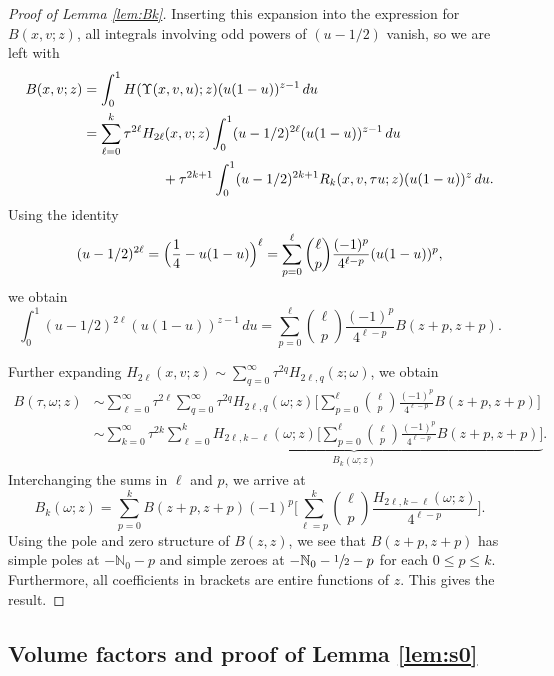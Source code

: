 \documentclass[JEP,XML,SOM,Unicode,NoFloatCountersInSection, NoEqCountersInSection,published]{cedram}
\theoremstyle{plain}
\theoremstyle{definition}
\theoremstyle{remark}
\def\Nm{{\mathbb{N}}}
\begin{document}
\begin{proof}[Proof of Lemma \ref{lem:Bk}]
Inserting this expansion into the expression for $B(x,v; z)$, all integrals involving odd powers of $(u-1/2)$ vanish, so we
are left with
\begin{align*}
B(x,v; z) &= \int_0^1 H(\Upsilon(x,v,u); z) (u(1-u))^{z-1}\,du \\
&= \sum_{\ell=0}^{k} \tau^{2\ell} H_{2\ell}(x,v; z) \int_0^1 (u-1/2)^{2\ell} (u(1-u))^{z-1}\,du \\
&\hspace*{2cm} + \tau^{2k+1} \int_0^1 (u-1/2)^{2k+1} R_{k} (x,v,\tau u; z) (u(1-u))^z\,du.
\end{align*}
Using the identity
\begin{equation*}
(u-1/2)^{2\ell} = \Bigl(\frac{1}{4} - u(1-u) \Bigr)^\ell = \sum_{p=0}^\ell \binom{\ell}{p} \frac{(-1)^p}{4^{\ell-p}} (u(1-u))^p,
\end{equation*}
we obtain
\begin{equation*}
\int_0^1 (u-1/2)^{2\ell} (u(1-u))^{z-1}\,du = \sum_{p=0}^\ell \binom{\ell}{p} \frac{(-1)^p}{4^{\ell-p}} B(z+p,z+p).
\end{equation*}

Further expanding $H_{2\ell} (x,v; z) \sim \sum_{q=0}^\infty \tau^{2q} H_{2\ell, q} (z; \omega)$, we obtain
\begin{align*}
B(\tau,\omega; z) &\sim \sum_{\ell=0}^{\infty} \tau^{2\ell} \sum_{q=0}^{\infty} \tau^{2q} H_{2\ell, q}(\omega; z) \biggl[\sum_{p=0}^\ell \binom{\ell}{p} \frac{(-1)^p}{4^{\ell-p}} B(z+p,z+p) \biggr] \\
&\sim \sum_{k=0}^\infty \tau^{2k} \underbrace{\sum_{\ell=0}^k H_{2\ell, k-\ell}(\omega; z) \biggl[\sum_{p=0}^\ell \binom{\ell}{p} \frac{(-1)^p}{4^{\ell-p}} B(z+p,z+p) \biggr]}_{B_k(\omega; z)}.
\end{align*}
Interchanging the sums in $\ell$ and $p$, we arrive at
\begin{equation*}
B_k(\omega; z) = \sum_{p=0}^k B(z+p, z+p) (-1)^p \biggl[\sum_{\ell=p}^k \binom{\ell}{p} \frac{H_{2\ell, k-\ell}(\omega; z)}{4^{\ell-p}} \biggr].
\end{equation*}
Using the pole and zero structure of $B(z,z)$, we see that $B(z+p,z+p)$ has simple poles at $-\Nm_0 - p$ and simple zeroes
at $-\Nm_0 - \sfrac{1}{2} - p$ for each $0\le p\le k$. Furthermore, all coefficients in brackets are entire functions of $z$.
This gives the result.
\end{proof}

\subsection{Volume factors and proof of Lemma \ref{lem:s0}} \label{sec:volumeFactors}
\end{document}

